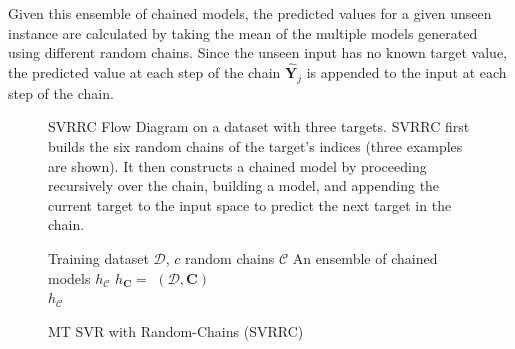 \documentclass[reqno]{vcuthesis}
\numberwithin{equation}{chapter}
\begin{document}
Given this ensemble of chained models, the predicted values for a given unseen instance are calculated by taking the mean of the multiple models generated using different random chains. Since the unseen input has no known target value, the predicted value at each step of the chain $\hat{\bm Y}_j$ is appended to the input at each step of the chain. 
\begin{figure}[t]
\centering \small
\begin{minipage}{\textwidth}
\centering \small
{}
\end{minipage}
\caption{\small SVRRC Flow Diagram on a dataset with three targets. SVRRC first builds the six random chains of the target's indices (three examples are shown). It then constructs a chained model by proceeding recursively over the chain, building a model, and appending the current target to the input space to predict the next target in the chain. } \label{fig:svrrc}
\begin{algorithm}[H]
\caption{MT SVR with Random-Chains (SVRRC)}
\small \centering
\label{alg:SVRRC} 
\begin{algorithmic}[1]
\renewcommand{\algorithmicrequire}{\textbf{Input:}}
\renewcommand{\algorithmicensure}{\textbf{Output:}}
\Require Training dataset $\mathcal{D}$, $c$ random chains $\mathcal{C}$
\Ensure  An ensemble of chained models $h_\mathcal{C}$
 
\State $h_{\bm C} = $ $(\mathcal{D},\bm C)$ 
\EndFor \\
\Return $h_\mathcal{C}$ 
\end{algorithmic} 
\end{algorithm}
\end{figure}
\end{document}
